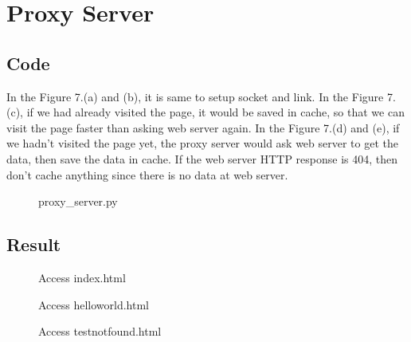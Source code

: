 \documentclass[12pt,a4paper]{article}
\begin{document}
\section{Proxy Server}    
\subsection{Code}
In the Figure 7.(a) and (b), it is same to setup socket and link.
In the Figure 7.(c), if we had already visited the page, it would be saved in cache, so that we can visit the page faster than asking web server again.
In the Figure 7.(d) and (e), if we hadn't visited the page yet, the proxy server would ask web server to get the data, then save the data in cache. 
If the web server HTTP response is 404, then don't cache anything since there is no data at web server.
\begin{figure}[H]
    \centering
    \caption{proxy\_server.py}
\end{figure}
\subsection{Result}

\begin{figure}[H]
    \centering
    \caption{Access index.html}
\end{figure}
\begin{figure}[H]
    \caption{Access helloworld.html}
\end{figure}
\begin{figure}[H]
    \caption{Access testnotfound.html}
\end{figure}
\end{document}
